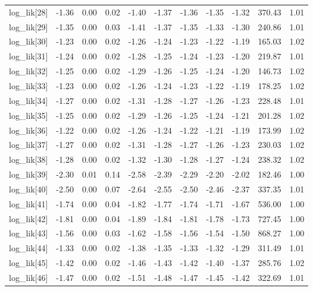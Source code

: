 \begin{table}[ht]
\begin{tabular}{rrrrrrrrrrr}
  log\_lik[28] & -1.36 & 0.00 & 0.02 & -1.40 & -1.37 & -1.36 & -1.35 & -1.32 & 370.43 & 1.01 \\ 
  log\_lik[29] & -1.35 & 0.00 & 0.03 & -1.41 & -1.37 & -1.35 & -1.33 & -1.30 & 240.86 & 1.01 \\ 
  log\_lik[30] & -1.23 & 0.00 & 0.02 & -1.26 & -1.24 & -1.23 & -1.22 & -1.19 & 165.03 & 1.02 \\ 
  log\_lik[31] & -1.24 & 0.00 & 0.02 & -1.28 & -1.25 & -1.24 & -1.23 & -1.20 & 219.87 & 1.01 \\ 
  log\_lik[32] & -1.25 & 0.00 & 0.02 & -1.29 & -1.26 & -1.25 & -1.24 & -1.20 & 146.73 & 1.02 \\ 
  log\_lik[33] & -1.23 & 0.00 & 0.02 & -1.26 & -1.24 & -1.23 & -1.22 & -1.19 & 178.25 & 1.02 \\ 
  log\_lik[34] & -1.27 & 0.00 & 0.02 & -1.31 & -1.28 & -1.27 & -1.26 & -1.23 & 228.48 & 1.01 \\ 
  log\_lik[35] & -1.25 & 0.00 & 0.02 & -1.29 & -1.26 & -1.25 & -1.24 & -1.21 & 201.28 & 1.02 \\ 
  log\_lik[36] & -1.22 & 0.00 & 0.02 & -1.26 & -1.24 & -1.22 & -1.21 & -1.19 & 173.99 & 1.02 \\ 
  log\_lik[37] & -1.27 & 0.00 & 0.02 & -1.31 & -1.28 & -1.27 & -1.26 & -1.23 & 230.03 & 1.02 \\ 
  log\_lik[38] & -1.28 & 0.00 & 0.02 & -1.32 & -1.30 & -1.28 & -1.27 & -1.24 & 238.32 & 1.02 \\ 
  log\_lik[39] & -2.30 & 0.01 & 0.14 & -2.58 & -2.39 & -2.29 & -2.20 & -2.02 & 182.46 & 1.00 \\ 
  log\_lik[40] & -2.50 & 0.00 & 0.07 & -2.64 & -2.55 & -2.50 & -2.46 & -2.37 & 337.35 & 1.01 \\ 
  log\_lik[41] & -1.74 & 0.00 & 0.04 & -1.82 & -1.77 & -1.74 & -1.71 & -1.67 & 536.00 & 1.00 \\ 
  log\_lik[42] & -1.81 & 0.00 & 0.04 & -1.89 & -1.84 & -1.81 & -1.78 & -1.73 & 727.45 & 1.00 \\ 
  log\_lik[43] & -1.56 & 0.00 & 0.03 & -1.62 & -1.58 & -1.56 & -1.54 & -1.50 & 868.27 & 1.00 \\ 
  log\_lik[44] & -1.33 & 0.00 & 0.02 & -1.38 & -1.35 & -1.33 & -1.32 & -1.29 & 311.49 & 1.01 \\ 
  log\_lik[45] & -1.42 & 0.00 & 0.02 & -1.46 & -1.43 & -1.42 & -1.40 & -1.37 & 285.76 & 1.02 \\ 
  log\_lik[46] & -1.47 & 0.00 & 0.02 & -1.51 & -1.48 & -1.47 & -1.45 & -1.42 & 322.69 & 1.01 \\ 

\end{tabular}
\end{table}

